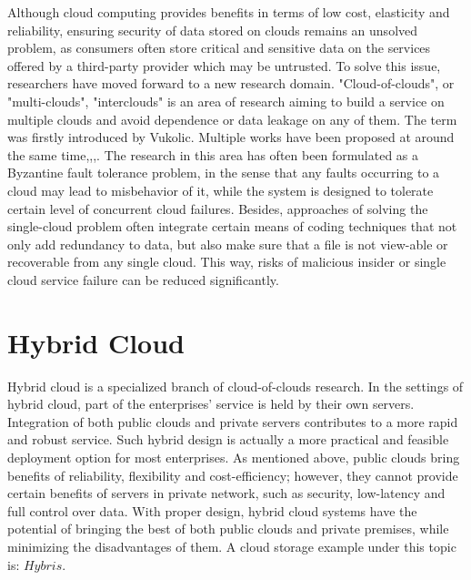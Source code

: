Although cloud computing provides benefits in terms of low cost, elasticity and reliability, ensuring security of data stored on clouds remains an unsolved problem, as consumers often store critical and sensitive data on the services offered by a third-party provider which may be untrusted. To solve this issue, researchers have moved forward to  a new research domain\cite{aizain2012multiclouds}. "Cloud-of-clouds", or "multi-clouds", "interclouds" is an area of research aiming to build a service on multiple clouds and avoid dependence or data leakage on any of them. The term was firstly introduced by Vukolic\cite{vukolic2010byzantine}. Multiple works have been proposed at around the same time\cite{bowers2009hail},\cite{abu2010racs},\cite{cachin2010dependable},\cite{bessani2013depsky}. The research in this area has often been formulated as a Byzantine fault tolerance problem\cite{lamport1982byzantine}, in the sense that any faults occurring to a cloud may lead to misbehavior of it, while the system is designed to tolerate certain level of concurrent cloud failures. Besides, approaches of solving the single-cloud problem often integrate certain means of coding techniques that not only add redundancy to data, but also make sure that a file is not view-able or recoverable from any single cloud. This way, risks of malicious insider or single cloud service failure can be reduced significantly.

\section{Hybrid Cloud}
\label{s:hybridcloud}

Hybrid cloud is a specialized branch of cloud-of-clouds research. In the settings of hybrid cloud, part of the enterprises' service is held by their own servers. Integration of both public clouds and private servers contributes to a more rapid and robust service. Such hybrid design is actually a more practical and feasible deployment option for most enterprises. As mentioned above, public clouds bring benefits of reliability, flexibility and cost-efficiency; however, they cannot provide certain benefits of servers in private network, such as security, low-latency and full control over data. With proper design, hybrid cloud systems have the potential of bringing the best of both public clouds and private premises, while minimizing the disadvantages of them. A cloud storage example under this topic is: $Hybris$\cite{dobre2014hybris}.

\newpage

